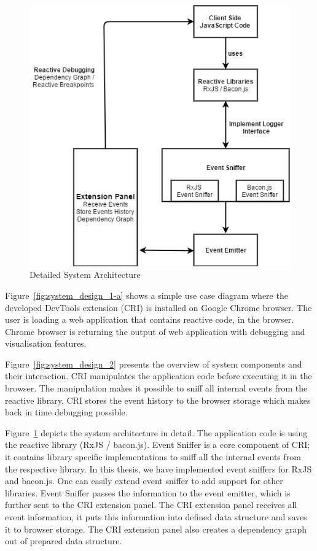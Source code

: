 \begin{figure}[!h]
	\centering
	\includegraphics[scale=0.5,trim=0 0 0 0]{gfx/system_design_detail.png}
	\caption{Detailed System Architecture}
	\label{fig:system_design_detail}
\end{figure}

Figure~\ref{fig:system_design_1-a}  shows a simple use case diagram where the developed DevTools extension (CRI) is installed on Google Chrome browser. The user is loading a web application that contains reactive code, in the browser. Chrome browser is returning the output of web application with debugging and visualisation features. 

Figure~\ref{fig:system_design_2} presents the overview of system components and their interaction. CRI manipulates the application code before executing it in the browser. The manipulation makes it possible to sniff all internal events from the reactive library. CRI stores the event history to the browser storage which makes back in time debugging possible. 


Figure~\ref{fig:system_design_detail} depicts the system architecture in detail. The application code is using the reactive library (RxJS / bacon.js). Event Sniffer is a core component of CRI; it contains library specific implementations to sniff all the internal events from the respective library. In this thesis, we have implemented event sniffers for RxJS and bacon.js.
One can easily extend event sniffer to add support for other libraries.
Event Sniffer passes the information to the event emitter, which is further sent to the CRI extension panel. The CRI extension panel receives all event information, it puts this information into defined data structure and saves it to browser storage. The CRI extension panel also creates a dependency graph out of prepared data structure. 


